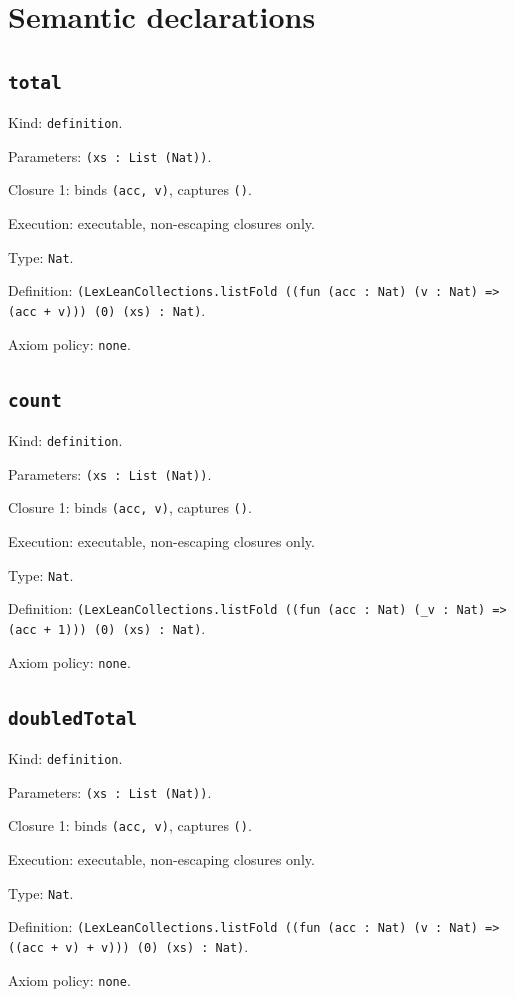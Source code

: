 \documentclass[11pt]{article}
\begin{document}
\section*{Semantic declarations}
\subsection*{\texttt{total}}
\noindent Kind: \texttt{definition}.\par
\noindent Parameters: \texttt{(xs : List (Nat))}.\par
\noindent Closure 1: binds \texttt{(acc, v)}, captures \texttt{()}.\par
\noindent Execution: executable, non-escaping closures only.\par
\noindent Type: \texttt{Nat}.\par
\noindent Definition: \texttt{(LexLeanCollections.listFold ((fun (acc : Nat) (v : Nat) => (acc + v))) (0) (xs) : Nat)}.\par
\noindent Axiom policy: \texttt{none}.\par
\subsection*{\texttt{count}}
\noindent Kind: \texttt{definition}.\par
\noindent Parameters: \texttt{(xs : List (Nat))}.\par
\noindent Closure 1: binds \texttt{(acc, v)}, captures \texttt{()}.\par
\noindent Execution: executable, non-escaping closures only.\par
\noindent Type: \texttt{Nat}.\par
\noindent Definition: \texttt{(LexLeanCollections.listFold ((fun (acc : Nat) (\_v : Nat) => (acc + 1))) (0) (xs) : Nat)}.\par
\noindent Axiom policy: \texttt{none}.\par
\subsection*{\texttt{doubledTotal}}
\noindent Kind: \texttt{definition}.\par
\noindent Parameters: \texttt{(xs : List (Nat))}.\par
\noindent Closure 1: binds \texttt{(acc, v)}, captures \texttt{()}.\par
\noindent Execution: executable, non-escaping closures only.\par
\noindent Type: \texttt{Nat}.\par
\noindent Definition: \texttt{(LexLeanCollections.listFold ((fun (acc : Nat) (v : Nat) => ((acc + v) + v))) (0) (xs) : Nat)}.\par
\noindent Axiom policy: \texttt{none}.\par
\end{document}
